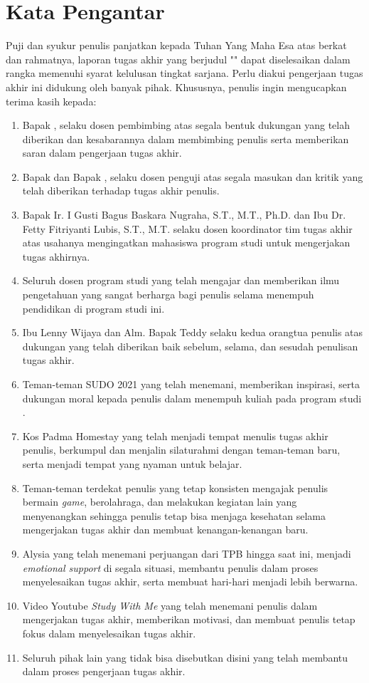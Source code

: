 \chapter*{Kata Pengantar}

Puji dan syukur penulis panjatkan kepada Tuhan Yang Maha Esa atas berkat dan rahmatnya, laporan tugas akhir yang berjudul "\thetitle" dapat diselesaikan dalam rangka memenuhi syarat kelulusan tingkat sarjana. Perlu diakui pengerjaan tugas akhir ini didukung oleh banyak pihak. Khususnya, penulis ingin mengucapkan terima kasih kepada:

\begin{enumerate}
	\item Bapak \namadosbingfull, selaku dosen pembimbing atas segala bentuk dukungan yang telah diberikan dan kesabarannya dalam membimbing penulis serta memberikan saran dalam pengerjaan tugas akhir.
	\item Bapak \namadosenpengsatufull{} dan Bapak \namadospengduafull, selaku dosen penguji atas segala masukan dan kritik yang telah diberikan terhadap tugas akhir penulis.
	\item Bapak Ir. I Gusti Bagus Baskara Nugraha, S.T., M.T., Ph.D. dan Ibu Dr. Fetty Fitriyanti Lubis, S.T., M.T.  selaku dosen koordinator tim tugas akhir atas usahanya mengingatkan mahasiswa program studi \stifull{} untuk mengerjakan tugas akhirnya.
	\item Seluruh dosen program studi \stifull{} \itb{} yang telah mengajar dan memberikan ilmu pengetahuan yang sangat berharga bagi penulis selama menempuh pendidikan di program studi ini.
	\item Ibu Lenny Wijaya dan Alm. Bapak Teddy selaku kedua orangtua penulis atas dukungan yang telah diberikan baik sebelum, selama, dan sesudah penulisan tugas akhir.
	\item Teman-teman SUDO 2021 yang telah menemani, memberikan inspirasi, serta dukungan moral kepada penulis dalam menempuh kuliah pada program studi \stifull.
	\item Kos Padma Homestay yang telah menjadi tempat menulis tugas akhir penulis, berkumpul dan menjalin silaturahmi dengan teman-teman baru, serta menjadi tempat yang nyaman untuk belajar.
	\item Teman-teman terdekat penulis yang tetap konsisten mengajak penulis bermain \textit{game}, berolahraga, dan melakukan kegiatan lain yang menyenangkan sehingga penulis tetap bisa menjaga kesehatan selama mengerjakan tugas akhir dan membuat kenangan-kenangan baru.
	\item Alysia yang telah menemani perjuangan dari TPB hingga saat ini, menjadi \textit{emotional support} di segala situasi, membantu penulis dalam proses menyelesaikan tugas akhir, serta membuat hari-hari menjadi lebih berwarna.
	\item Video Youtube \textit{Study With Me} yang telah menemani penulis dalam mengerjakan tugas akhir, memberikan motivasi, dan membuat penulis tetap fokus dalam menyelesaikan tugas akhir.
	\item Seluruh pihak lain yang tidak bisa disebutkan disini yang telah membantu dalam proses pengerjaan tugas akhir.
\end{enumerate}

